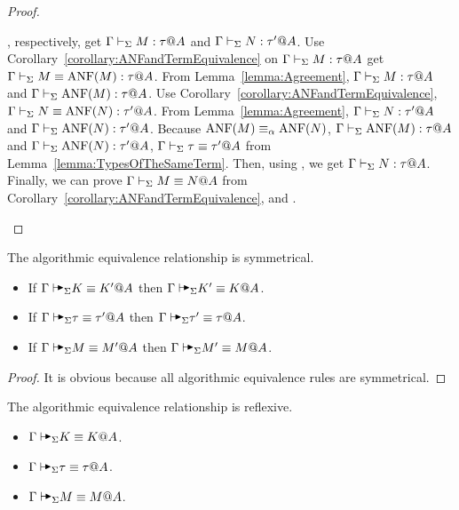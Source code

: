 \begin{proof}
\begin{rneqncase}{\QAANF}
        \), respectively, get \( \Gamma \vdash_\Sigma M : \tau @ A \) and \( \Gamma \vdash_\Sigma N : \tau' @
        A \). Use Corollary~\ref{corollary:ANFandTermEquivalence} on \( \Gamma \vdash_\Sigma M
        : \tau @ A \)  get \( \Gamma \vdash_\Sigma M \equiv \text{ANF}(M) : \tau @ A \).  From
        Lemma~\ref{lemma:Agreement}, \( \Gamma \vdash_\Sigma M : \tau @ A \) and \( \Gamma \vdash_\Sigma
        \text{ANF}(M) : \tau @ A \).  Use
        Corollary~\ref{corollary:ANFandTermEquivalence}, \( \Gamma \vdash_\Sigma N \equiv \text{ANF}(N)
        : \tau' @ A \). From Lemma~\ref{lemma:Agreement}, \( \Gamma \vdash_\Sigma N : \tau' @
        A \) and \( \Gamma \vdash_\Sigma \text{ANF}(N) : \tau' @ A \).  Because \( \text{ANF}(M) \equiv_\alpha
        \text{ANF}(N) \), \( \Gamma \vdash_\Sigma \text{ANF}(M) : \tau @ A \) and \( \Gamma \vdash_\Sigma \text{ANF}(N) : \tau'
        @ A \), \( \Gamma \vdash_\Sigma \tau \equiv \tau' @ A \) from
        Lemma~\ref{lemma:TypesOfTheSameTerm}.  Then, using \TConv, we get \( \Gamma \vdash_\Sigma N
        : \tau @ A \). Finally, we can prove \( \Gamma \vdash_\Sigma M \equiv N@A \) from
        Corollary~\ref{corollary:ANFandTermEquivalence}, \QTrans and \QSym.
    \end{rneqncase}
\end{proof}

\begin{lemma}
    The algorithmic equivalence relationship is symmetrical.
    \label{lemma:SymmetricityinAlgorithmicEquivalence}
    \begin{itemize}
        \item If \( \G \AVS K \E K' @ A \) then \( \G \AVS K' \E K @ A \).
        \item If \( \G \AVS \tau \E \tau' @ A \) then \( \G \AVS \tau' \E \tau @ A \).
        \item If \( \G \AVS M \E M' @ A \) then \( \G \AVS M' \E M @ A \).
    \end{itemize}
\end{lemma}

\begin{proof}
    It is obvious because all algorithmic equivalence rules are symmetrical.
\end{proof}

\begin{lemma}
    The algorithmic equivalence relationship is reflexive.
    \label{lemma:ReflexivityinAlgorithmicEquivalence}
    \begin{itemize}
        \item \( \G \AVS K \E K @ A \).
        \item \( \G \AVS \tau \E \tau @ A \).
        \item \( \G \AVS M \E M @ A \).
    \end{itemize}
\end{lemma}

